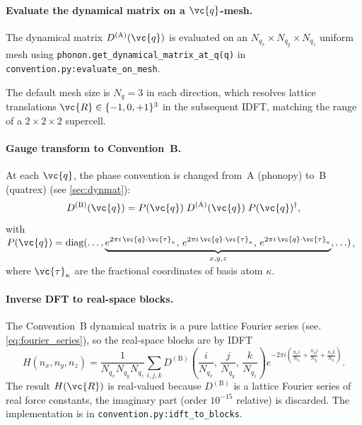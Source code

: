 \paragraph{Evaluate the dynamical matrix on a $\vc{q}$-mesh.}
The dynamical matrix $D^{(\mathrm{A})}(\vc{q})$ is evaluated on
an $N_{q_x} \times N_{q_y} \times N_{q_z}$ uniform mesh using
\texttt{phonon.get\_dynamical\_matrix\_at\_q(q)} in \texttt{convention.py:evaluate\_on\_mesh}.

The default mesh size is $N_q = 3$ in each direction, which resolves
lattice translations $\vc{R} \in \{-1,0,+1\}^3$ in the subsequent
IDFT, matching the range of a $2\times2\times2$ supercell.

\paragraph{Gauge transform to Convention~B.}
At each $\vc{q}$, the phase convention is changed from~A (phonopy) to~B
(quatrex) (see \cref{sec:dynmat}):
\begin{equation}\label{eq:gauge}
  D^{(\mathrm{B})}(\vc{q})
  = P(\vc{q})\;D^{(\mathrm{A})}(\vc{q})\;P(\vc{q})^\dagger,
\end{equation}
with
$P(\vc{q}) = \mathrm{diag}(\ldots,
\underbrace{e^{2\pi i\,\vc{q}\cdot\vc{\tau}_\kappa},\,
            e^{2\pi i\,\vc{q}\cdot\vc{\tau}_\kappa},\,
            e^{2\pi i\,\vc{q}\cdot\vc{\tau}_\kappa}}_{x,y,z},
\ldots)$,
where $\vc{\tau}_\kappa$ are the fractional coordinates of basis atom
$\kappa$.

\paragraph{Inverse DFT to real-space blocks.}
The Convention~B dynamical matrix is a pure lattice Fourier series
(see. \eqref{eq:fourier_series}), so the real-space blocks are by IDFT
\begin{equation}\label{eq:idft}
  H(n_x, n_y, n_z)
  = \frac{1}{N_{q_x} N_{q_y} N_{q_z}}
    \sum_{i,j,k}
    D^{(\mathrm{B})}\!\!\left(\frac{i}{N_{q_x}},\,
                               \frac{j}{N_{q_y}},\,
                               \frac{k}{N_{q_z}}\right)
    e^{-2\pi i\left(\frac{n_x i}{N_{q_x}}
                   + \frac{n_y j}{N_{q_y}}
                   + \frac{n_z k}{N_{q_z}}\right)}.
\end{equation}
The result $H(\vc{R})$ is real-valued because $D^{(\mathrm{B})}$ is a
lattice Fourier series of real force constants, the imaginary part
(order $10^{-15}$ relative) is discarded. The implementation is
in \texttt{convention.py:idft\_to\_blocks}.

